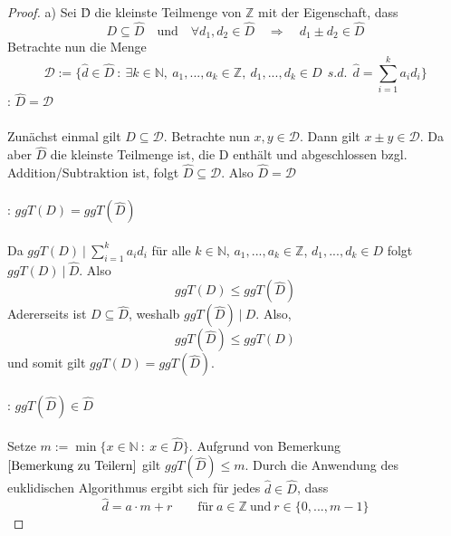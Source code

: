 \documentclass[a4paper,12pt]{scrartcl}
\theoremstyle{definition}
\begin{document}
\begin{proof}
a) Sei \^{D} die kleinste Teilmenge von $\mathbb{Z}$ mit der Eigenschaft, dass
\begin{equation*}
D \subseteq \hat{D} \quad \mathrm{und} \quad \forall d_{1},d_{2} \in \hat{D} \quad \Rightarrow \quad d_{1} \pm d_{2} \in \hat{D}
\end{equation*}
Betrachte nun die Menge
\begin{equation*}
\mathcal{D} := \lbrace \hat{d} \in \hat{D} \: : \: \exists k \in \mathbb{N}, \: a_{1},...,a_{k} \in \mathbb{Z}, \: d_{1},...,d_{k} \in D \: \: s.d. \: \: \hat{d} = \sum_{i=1}^{k} a_{i}d_{i} \rbrace
\end{equation*}
: $\hat{D} = \mathcal{D}$
\\
\\
Zunächst einmal gilt $D \subseteq \mathcal{D}$. Betrachte nun $x,y \in \mathcal{D}$. Dann gilt $x \pm y \in \mathcal{D}$. Da aber $\hat{D}$ die kleinste Teilmenge ist, die D enthält und abgeschlossen bzgl. Addition/Subtraktion ist, folgt $\hat{D} \subseteq \mathcal{D}$. Also $\hat{D} = \mathcal{D}$
\\
\\
: $ggT(D) = ggT(\hat{D})$
\\
\\
Da $ggT(D) \: | \: \sum_{i=1}^{k} a_{i}d_{i}$ für alle $k \in \mathbb{N}$, $a_{1},...,a_{k} \in \mathbb{Z}$, $d_{1},...,d_{k} \in D$ folgt $ggT(D) \: | \: \hat{D}$. Also
\begin{equation*}
ggT(D) \leq ggT(\hat{D})
\end{equation*}
Adererseits ist $D \subseteq \hat{D}$, weshalb $ggT(\hat{D}) \: | \: D$. Also,
\begin{equation*}
ggT(\hat{D}) \leq ggT(D)
\end{equation*}
und somit gilt $ggT(D) = ggT(\hat{D})$.
\\
\\
: $ggT(\hat{D}) \in \hat{D}$
\\
\\
Setze $m := \min \lbrace x \in \mathbb{N} \: : \: x \in \hat{D} \rbrace$. Aufgrund von Bemerkung $\ref{Bemerkung zu Teilern}$ gilt $ggT(\hat{D}) \leq m$. Durch die Anwendung des euklidischen Algorithmus ergibt sich für jedes $\hat{d} \in \hat{D}$, dass
\begin{equation*}
\hat{d} = a \cdot m + r \qquad \mathrm{für} \: a \in \mathbb{Z} \: \mathrm{und} \: r \in \lbrace 0,...,m-1 \rbrace
\end{equation*}

\end{proof}
\end{document}
